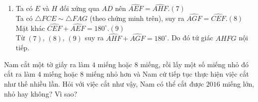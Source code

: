 \begin{ex}
{\begin{enumerate}
      Ta có tứ giác $ABCD$ nội tiếp nên $\widehat {EBA}=\widehat {ECD}$.\\
      Từ đó $\triangle EAB \sim \triangle EDC$ (g-g), suy ra $\dfrac{AB}{CD}=\dfrac{EA}{ED}=\dfrac{EB}{EC}$.\hfill$(5)$\\
      Từ $(4)$ và $(5)$ suy ra $\dfrac{EB}{EC} = \dfrac{FA}{FC} \Leftrightarrow \dfrac{FC}{EC} = \dfrac{FA}{EB}$.\\
      Mặt khác $EB=AG$ nên $\dfrac{FC}{EC} = \dfrac{FA}{AG}$.\hfill$(**)$\\
      Kết hợp $(*)$ và $(**)$ ta được $\triangle FCE \sim \triangle FAG$ (c-g-c), suy ra $\dfrac{FG}{FE} = \dfrac{FA}{FC}$.\hfill$(6)$\\
      Từ $(4)$ và $(6)$ ta thu được $\dfrac{FB}{FD} = \dfrac{FG}{FE} \Leftrightarrow FD.FG=FB.FE$. 
        \item Ta có $E$ và $H$ đối xứng qua $AD$ nên $\widehat {AEF}=\widehat {AHF}$.\hfill$(7)$\\
   Ta có $\triangle FCE \sim \triangle FAG$ (theo chứng minh trên), suy ra $\widehat {AGF}=\widehat {CEF}$.\hfill$(8)$\\
   Mặt khác $\widehat {CEF} + \widehat {AEF}=180^\circ$.\hfill$(9)$\\
Từ $(7)$, $(8)$, $(9)$ suy ra    $\widehat {AHF} + \widehat {AGF}=180^\circ$. Do đó tứ giác $AHFG$ nội tiếp.
    \end{enumerate}
    }
\end{ex}



\begin{ex}%
Nam cắt một tờ giấy ra làm $4$ miếng hoặc $8$ miếng, rồi lấy một số miếng nhỏ đó cắt ra làm $4$ miếng hoặc $8$ miếng nhỏ hơn và Nam cứ tiếp tục thực hiện việc cắt như thế nhiều lần. Hỏi với việc cắt như vậy, Nam có thể cắt được $2016$ miếng lớn, nhỏ hay không? Vì sao?
\end{ex}


